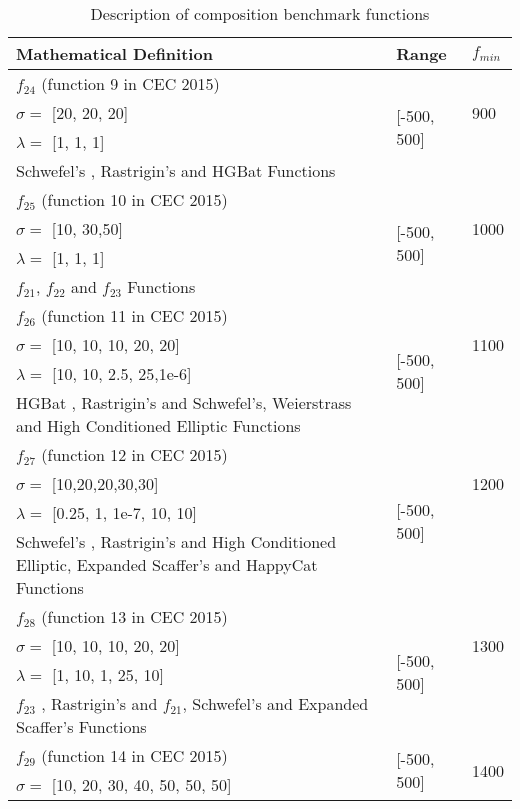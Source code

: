 \documentclass[../main.tex]{subfiles}
\begin{document}
\begin{table}[!t]
\caption{Description of composition benchmark functions}
\label{tbl_compos_funcs}
\centering
\begin{tabular}{p{9cm} p{2cm} p{1cm}}
 \hline Mathematical Definition & Range & $f_{min}$  \\ 
 \hline
$f_{24}$ (function 9 in CEC 2015) & \multirow{4}{*}{[-500, 500]} & \multirow{3}{*}{900} \\
$\sigma = $ [20, 20, 20] & \\
$\lambda = $ [1, 1, 1] & \\
Schwefel's , Rastrigin's  and  HGBat  Functions & \\ \hline
$f_{25}$ (function 10 in CEC 2015) & \multirow{4}{*}{[-500, 500]} & \multirow{3}{*}{1000} \\
$\sigma = $  [10, 30,50]  & \\
$\lambda = $  [1, 1, 1]  & \\
$f_{21}$, $f_{22}$ and $f_{23}$ Functions & \\ \hline
$f_{26}$ (function 11 in CEC 2015) & \multirow{4}{*}{[-500, 500]} & \multirow{3}{*}{1100} \\
$\sigma = $  [10, 10, 10, 20, 20]  & \\
$\lambda = $  [10, 10, 2.5, 25,1e-6]  & \\
 HGBat ,  Rastrigin’s  and   Schwefel's,  Weierstrass and  High Conditioned Elliptic   Functions & \\ \hline
$f_{27}$ (function 12 in CEC 2015) & \multirow{4}{*}{[-500, 500]} & \multirow{3}{*}{1200} \\
$\sigma = $  [10,20,20,30,30] & \\
$\lambda = $ [0.25, 1, 1e-7, 10, 10]  & \\
 Schwefel's  , Rastrigin's  and   High Conditioned Elliptic, Expanded Scaffer’s and  HappyCat Functions & \\ \hline
$f_{28}$ (function 13 in CEC 2015) & \multirow{4}{*}{[-500, 500]} & \multirow{3}{*}{1300} \\
$\sigma = $  [10, 10, 10, 20, 20]  & \\
$\lambda = $  [1, 10, 1, 25, 10]  & \\
$f_{23}$ , Rastrigin's  and  $f_{21}$,  Schwefel's  and  Expanded Scaffer’s  Functions & \\ \hline
$f_{29}$ (function 14 in CEC 2015) & \multirow{4}{*}{[-500, 500]} & \multirow{3}{*}{1400} \\
$\sigma = $  [10, 20, 30, 40, 50, 50, 50] & \\

\end{tabular}
\end{table}
\end{document}
